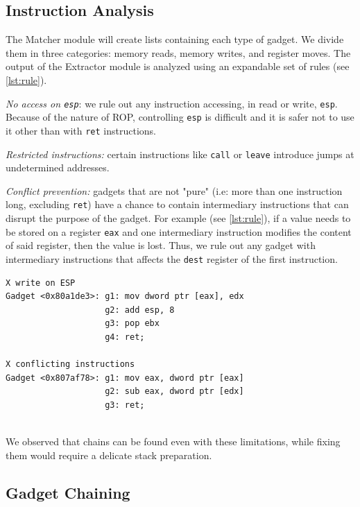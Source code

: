 \documentclass[10pt,twocolumn]{article}
\begin{document}
\subsection{Instruction Analysis}

The Matcher module will create lists containing each type of gadget. We
divide them in three categories: memory reads, memory writes, and register
moves. The output of the Extractor module is analyzed using an expandable set
of rules (see \autoref{lst:rule}).

\textit{No access on \texttt{esp}}: we rule out any instruction accessing, in
read or write, \texttt{esp}. Because of the nature of ROP, controlling
\texttt{esp} is difficult and it is safer not to use it other than with \texttt{ret}
instructions.

\textit{Restricted instructions:} certain instructions like \texttt{call} or
\texttt{leave} introduce jumps at undetermined addresses.

\textit{Conflict prevention:} gadgets that are not "pure" (i.e: more than one
instruction long, excluding \texttt{ret}) have a chance to contain intermediary
instructions that can disrupt the purpose of the gadget. For example (see
\autoref{lst:rule}), if a
value needs to be stored on a register \texttt{eax} and one intermediary
instruction modifies the content of said register, then the value is lost.
Thus, we rule out any gadget with intermediary instructions that affects the
\texttt{dest} register of the first instruction.


\begin{lstlisting}[float=h,aboveskip=\medskipamount,belowskip=0pt,caption=Rule
verification,label=lst:rule]
X write on ESP
Gadget <0x80a1de3>: g1: mov dword ptr [eax], edx
                    g2: add esp, 8
                    g3: pop ebx
                    g4: ret;

X conflicting instructions
Gadget <0x807af78>: g1: mov eax, dword ptr [eax]
                    g2: sub eax, dword ptr [edx]
                    g3: ret;


\end{lstlisting}

We observed that chains can be found even with these limitations, while fixing
them would require a delicate stack preparation.


\subsection{Gadget Chaining}
\end{document}
